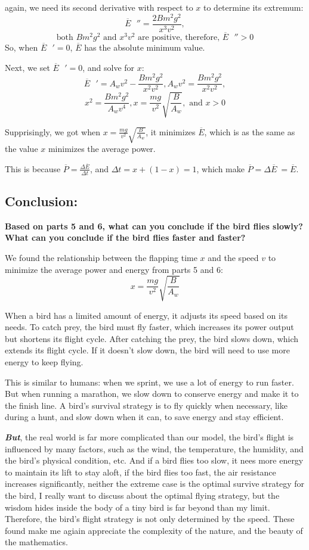 \documentclass{article}
\begin{document}
again, we need its second derivative with respect to \(x\) to determine its extremum:
\[\overline{E}\text{ }'' = \frac{2Bm^2g^2}{x^3v^2},\]
\[\text{both }Bm^2g^2 \text{ and } x^3v^2 \text{ are positive, therefore, } \overline{E} \text{ }'' > 0\]
So, when \(\overline{E}\text{ }' = 0\), \(\overline{E}\) has the absolute minimum value.

Next, we set \(\overline{E}\text{ }' = 0\), and solve for \(x\):
\[\overline{E}\text{ }' = A_wv^2-\frac{Bm^2g^2}{x^2v^2}, A_wv^2 = \frac{Bm^2g^2}{x^2v^2},\]
\[x^2=\frac{Bm^2g^2}{A_wv^4}, x = \frac{mg}{v^2}\sqrt{\frac{B}{A_w}},\text{ and }x > 0\]

Supprisingly, we got when \(x = \frac{mg}{v^2}\sqrt{\frac{B}{A_w}}\), it minimizes \(\overline{E}\), which is as the same as the value \(x\) minimizes the average power.

This is because \(\overline{P}= \frac{{\Delta \overline{E}}}{\Delta t}\), and \(\Delta t = x + (1-x) =1\), which make \(\overline{P} = \Delta \overline{E}\ = \overline{E}\).

\subsection*{Conclusion:}
{\large \bfseries Based on parts 5 and 6, what can you conclude if the bird flies slowly? What can you conclude if the bird flies faster and faster?}

We found the relationship between the flapping time \(x\) and the speed \(v\) to minimize the average power and energy from parts 5 and 6:
\[x = \frac{mg}{v^2}\sqrt{\frac{B}{A_w}}\]

When a bird has a limited amount of energy, it adjusts its speed based on its needs. To catch prey, the bird must fly faster, which increases its power output but shortens its flight cycle. After catching the prey, the bird slows down, which extends its flight cycle. If it doesn’t slow down, the bird will need to use more energy to keep flying.

This is similar to humans: when we sprint, we use a lot of energy to run faster. But when running a marathon, we slow down to conserve energy and make it to the finish line. A bird’s survival strategy is to fly quickly when necessary, like during a hunt, and slow down when it can, to save energy and stay efficient.

\textbf{\textit{But}}, the real world is far more complicated than our model, the bird's flight is influenced by many factors, such as the wind, the temperature, the humidity, and the bird's physical condition, etc. And if a bird flies too slow, it nees more energy to maintain its lift to stay aloft, if the bird flies too fast, the air resistance increases significantly, neither the extreme case is the optimal survive strategy for the bird, I really want to discuss about the optimal flying strategy, but the wisdom hides inside the body of a tiny bird is far beyond than my limit. Therefore, the bird's flight strategy is not only determined by the speed. These found make me agiain appreciate the complexity of the nature, and the beauty of the mathematics.
\end{document}
